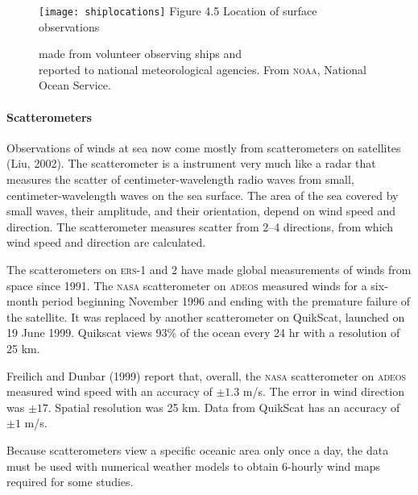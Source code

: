 \begin{figure}[t!]
\centering
\texttt{[image: shiplocations]}
\footnotesize
Figure 4.5 Location of surface observations \rule{0mm}{3ex}made from volunteer
observing ships and\\ reported to national meteorological agencies. From
\textsc{noaa}, National Ocean Service.

\label{fig:shiplocations}
\vspace{-4ex}
\end{figure}

\paragraph{Scatterometers}
 Observations of winds at sea now come
mostly from scatterometers on satellites (Liu, 2002). The scatterometer is a instrument very
much like a radar that measures the scatter of centimeter-wavelength radio waves from small,
centimeter-wavelength waves on the sea surface. The area of the sea covered by small waves, their amplitude, and their orientation, depend on wind speed and direction. The scatterometer measures scatter from 2--4 directions, from which wind speed and direction are calculated.

The scatterometers on \textsc{ers-1} and 2 have made global measurements of
winds from space since 1991. The \textsc{nasa} scatterometer on
\textsc{adeos} measured winds for a six-month period beginning November 1996 and ending with
the premature failure of the satellite. It was replaced by another scatterometer on QuikScat, launched on 19 June 1999. Quikscat views
93\% of the ocean every 24 hr with a resolution of 25 km. 

Freilich and Dunbar (1999) report that, overall, the \textsc{nasa}
scatterometer on \textsc{adeos} measured wind speed with an
accuracy of
$\pm 1.3$ m/s. The error in wind direction was $\pm17$\degrees. Spatial resolution was 25 km.
Data from QuikScat has an accuracy of $\pm 1$ m/s.

Because scatterometers view a specific oceanic area only once a day, the
data must be used with numerical weather models to obtain 6-hourly wind maps required for some
studies.

